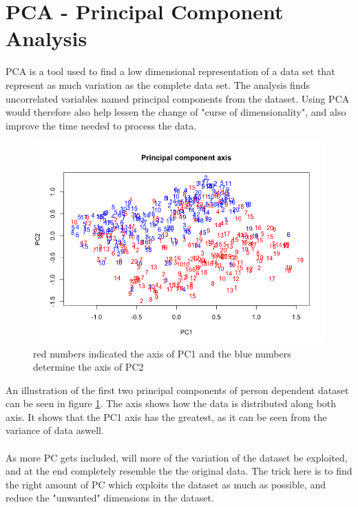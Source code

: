 \section{PCA - Principal Component Analysis}
PCA is a tool used to find a low dimensional representation of a data set that represent as much variation as the complete data set.   The analysis finds uncorrelated variables named principal components from the dataset.  Using PCA would therefore also help lessen the change of "curse of dimensionality", and also improve the time needed to process the data. 

\begin{figure}[H]
\centering
\includegraphics[width = \textwidth]{graphics/PCa-axis.png}
\caption{ red numbers indicated the axis of PC1 and the blue numbers determine the axis of PC2}
\label{fig:pca_vis}
\end{figure}

An illustration of the first two principal components of person dependent dataset can be seen in figure \ref{fig:pca_vis}. The axis shows how the data is distributed along both axis.  It shows that the PC1 axis has the greatest, as it can be seen from the variance of data aswell. 
\\
\\
As more PC gets included, will more of the variation of the dataset be exploited, and at the end completely resemble the the original data. The trick here is to find the right amount of PC which exploits the dataset as much as possible, and reduce the "unwanted" dimensions in the dataset. 

